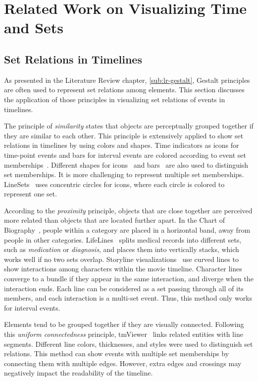 \section{Related Work on Visualizing Time and Sets}
\label{sub:ts-review}

\subsection{Set Relations in Timelines}
As presented in the Literature Review chapter, \autoref{sub:lr-gestalt}, Gestalt principles are often used to represent set relations among elements. This section discusses the application of those principles in visualizing set relations of events in timelines.

The principle of \textit{similarity} states that objects are perceptually grouped together if they are similar to each other. This principle is extensively applied to show set relations in timelines by using colors and shapes. Time indicators as icons for time-point events and bars for interval events are colored according to event set memberships~\cite{SimileTimeline2009,Wang2008}. Different shapes for icons~\cite{TimeGlider2016} and bars~\cite{Plaisant1998} are also used to distinguish set memberships. It is more challenging to represent multiple set memberships. LineSets~\cite{Alper2011} uses concentric circles for icons, where each circle is colored to represent one set.

According to the \textit{proximity} principle, objects that are close together are perceived more related than objects that are located further apart. In the Chart of Biography~\cite{Priestley1765}, people within a category are placed in a horizontal band, away from people in other categories. LifeLines~\cite{Plaisant1998} splits medical records into different sets, such as \textit{medication} or \textit{diagnosis}, and places them into vertically stacks, which works well if no two sets overlap. Storyline visualizations~\cite{Tanahashi2012,Liu2013} use curved lines to show interactions among characters within the movie timeline. Character lines converge to a bundle if they appear in the same interaction, and diverge when the interaction ends. Each line can be considered as a set passing through all of its members, and each interaction is a multi-set event. Thus, this method only works for interval events.

Elements tend to be grouped together if they are visually connected. Following this \textit{uniform connectedness} principle, tmViewer~\cite{Kumar1998} links related entities with line segments. Different line colors, thicknesses, and styles were used to distinguish set relations. This method can show events with multiple set memberships by connecting them with multiple edges. However, extra edges and crossings may negatively impact the readability of the timeline.

